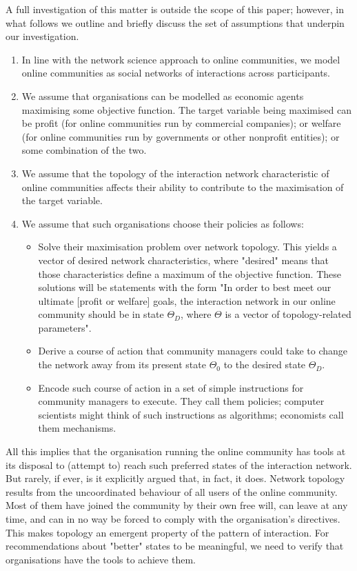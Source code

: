 A full investigation of this matter is outside the scope of this paper; however, in what follows we outline and briefly discuss the set of assumptions that underpin our investigation. 

\begin{enumerate}
\item In line with the network science approach to online communities, we model online communities as social networks of interactions across participants. 
\item We assume that organisations can be modelled as economic agents maximising some objective function. The target variable being maximised can be profit (for online communities run by commercial companies); or welfare (for online communities run by governments or other nonprofit entities); or some combination of the two. 
\item We assume that the topology of the interaction network characteristic of online communities affects their ability to contribute to the maximisation of the target variable. 
\item We assume that such organisations choose their policies as follows: 
\begin{itemize} 
	\item Solve their maximisation problem over network topology. This yields a vector of desired network characteristics, where "desired" means that those characteristics define a maximum of the objective function. These solutions will be statements with the form "In order to best meet our ultimate [profit or welfare] goals, the interaction network in our online community should be in state $\Theta_D$, where $\Theta$ is a vector of topology-related parameters".
	\item Derive a course of action that community managers could take to change the network away from its present state $\Theta_0$ to the desired state $\Theta_D$.
	\item Encode such course of action in a set of simple instructions for community managers to execute. They call them policies;  computer scientists might think of such instructions as algorithms; economists call them mechanisms. 
\end{itemize}
\end{enumerate}

All this implies that the organisation running the online community has tools at its disposal to (attempt to) reach such preferred states of the interaction network. But rarely, if ever, is it explicitly argued that, in fact, it does. Network topology results from the uncoordinated behaviour of all users of the online community. Most of them have joined the community by their own free will, can leave at any time, and can in no way be forced to comply with the organisation's directives. This makes topology an emergent property of the pattern of interaction. For recommendations about "better" states to be meaningful, we need to verify that organisations have the tools to achieve them. 

